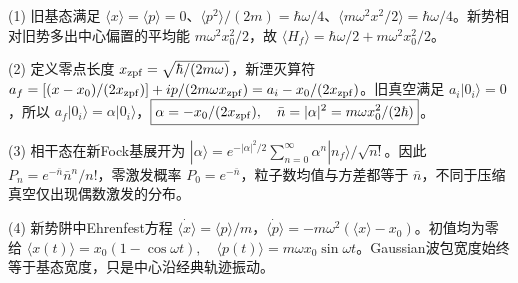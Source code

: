 (1) 旧基态满足 \(\langle x\rangle=\langle p\rangle=0\)、\(\langle p^2\rangle/(2m)=\hbar\omega/4\)、\(\langle m\omega^2x^2/2\rangle=\hbar\omega/4\)。新势相对旧势多出中心偏置的平均能 \(m\omega^2x_0^2/2\)，故 \(\boxed{\langle H_f\rangle=\hbar\omega/2+m\omega^2x_0^2/2}\)。

(2) 定义零点长度 \(x_{\rm zpf}=\sqrt{\hbar/(2m\omega)}\)，新湮灭算符 \(a_f=[(x-x_0)/(2x_{\rm zpf})]+ip/(2m\omega x_{\rm zpf})=a_i-x_0/(2x_{\rm zpf})\)。旧真空满足 \(a_i|0_i\rangle=0\)，所以 \(a_f|0_i\rangle=\alpha|0_i\rangle\)，\(\boxed{\alpha=-x_0/(2x_{\rm zpf}),\quad\bar n=|\alpha|^2=m\omega x_0^2/(2\hbar)}\)。

(3) 相干态在新Fock基展开为 \(|\alpha\rangle=e^{-|\alpha|^2/2}\sum_{n=0}^\infty\alpha^n|n_f\rangle/\sqrt{n!}\)。因此 \(\boxed{P_n=e^{-\bar n}\bar n^n/n!}\)，零激发概率 \(P_0=e^{-\bar n}\)，粒子数均值与方差都等于 \(\bar n\)，不同于压缩真空仅出现偶数激发的分布。

(4) 新势阱中Ehrenfest方程 \(\dot{\langle x\rangle}=\langle p\rangle/m\)，\(\dot{\langle p\rangle}=-m\omega^2(\langle x\rangle-x_0)\)。初值均为零给 \(\boxed{\langle x(t)\rangle=x_0(1-\cos\omega t),\quad\langle p(t)\rangle=m\omega x_0\sin\omega t}\)。Gaussian波包宽度始终等于基态宽度，只是中心沿经典轨迹振动。
